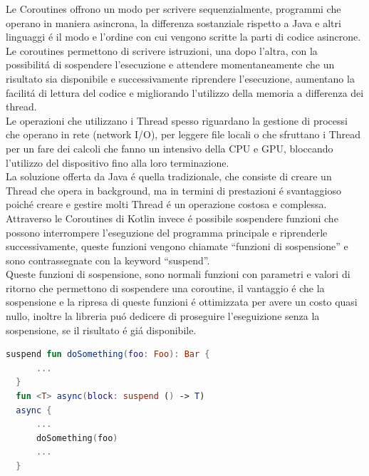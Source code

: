 Le Coroutines offrono un modo per scrivere sequenzialmente, programmi che operano in maniera asincrona, la differenza sostanziale rispetto a Java e altri linguaggi \'e il modo e l'ordine con cui vengono scritte la parti di codice asincrone.\\
Le coroutines permettono di scrivere istruzioni, una dopo l'altra, con la possibilit\'a di sospendere l'esecuzione e attendere momentaneamente che un risultato sia disponibile e successivamente riprendere l'esecuzione, aumentano la facilit\'a di lettura del codice e migliorando l'utilizzo della memoria a differenza dei thread.\\
Le operazioni che utilizzano i Thread spesso riguardano la gestione di processi che operano in rete (network I/O), per leggere file locali o che sfruttano i Thread per un fare dei calcoli che fanno un intensivo della CPU e GPU, bloccando l'utilizzo del dispositivo fino alla loro terminazione.\\
La soluzione offerta da Java \'e quella tradizionale, che consiste di creare un Thread che opera in background, ma in termini di prestazioni \'e svantaggioso poich\'e creare e gestire molti Thread \'e un operazione costosa e complessa.\\
Attraverso le Coroutines di Kotlin invece \'e possibile sospendere funzioni che possono interrompere l'eseguzione del programma principale e riprenderle successivamente, queste funzioni vengono chiamate ``funzioni di sospensione'' e sono contrassegnate con la keyword ``suspend''.\\
Queste funzioni di sospensione, sono normali funzioni con parametri e valori di ritorno che permettono di sospendere una coroutine, il vantaggio \'e che la sospensione e la ripresa di queste funzioni \'e ottimizzata per avere un costo quasi nullo, inoltre la libreria pu\'o dedicere di proseguire l'eseguizione senza la sospensione, se il risultato \'e gi\'a disponibile.

\begin{lstlisting}[language=kotlin,caption={Esempio Kotlin Coroutines }]
  suspend fun doSomething(foo: Foo): Bar {
      ...
  }
  fun <T> async(block: suspend () -> T)
  async {
      ...
      doSomething(foo)
      ...
  }

\end{lstlisting}

